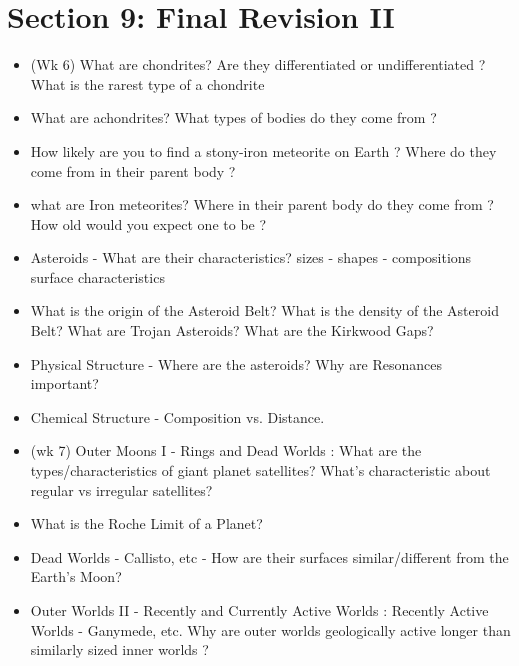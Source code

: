 \documentclass[paper=a4, fontsize=11pt]{scrartcl} %
\numberwithin{equation}{section} %
\begin{document}

\section{Section 9: Final Revision II }


\begin{itemize}
\item (Wk 6)   What   are chondrites?  Are they differentiated or undifferentiated ? What is the rarest type of a chondrite 
\item What are achondrites?  What types of bodies do they come from  ? 

\item How  likely are you to find a stony-iron meteorite   on Earth ? Where do they come from in their parent body ? 

\item what are Iron meteorites?  Where in their parent body do they come from ? How old would you expect one to be ? 

\item Asteroids - What are their characteristics? sizes - shapes - compositions surface characteristics	
\item What is the origin of the Asteroid Belt?  What is the density of the Asteroid Belt? What are Trojan Asteroids?
What are the Kirkwood Gaps?
\item Physical Structure - Where are the asteroids? Why are Resonances important?
\item Chemical Structure - Composition vs. Distance.


\item (wk 7)  Outer Moons I - Rings and Dead Worlds  : What are the types/characteristics of giant planet satellites? What's characteristic about regular vs irregular satellites?  
\item What is the Roche Limit of a Planet? 
\item Dead Worlds - Callisto, etc  - How are their surfaces similar/different from the Earth's Moon?


\item Outer Worlds II - Recently and Currently Active Worlds : Recently Active Worlds - Ganymede, etc.
Why are outer worlds geologically active longer than similarly sized inner worlds ? 


\end{itemize}
\end{document}
